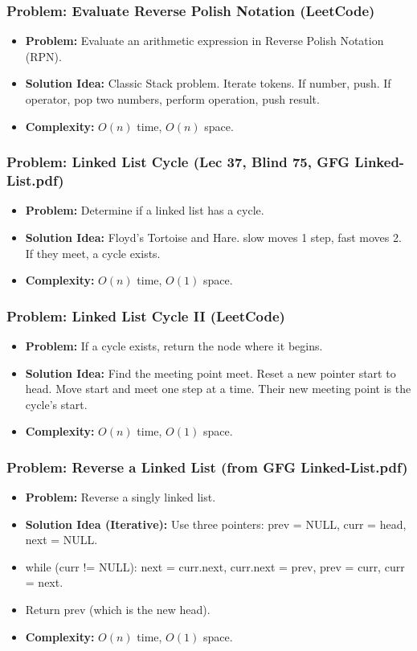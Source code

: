 \subsubsection{Problem: Evaluate Reverse Polish Notation (LeetCode)}
\begin{itemize}
\item \textbf{Problem:} Evaluate an arithmetic expression in Reverse Polish Notation (RPN).
\item \textbf{Solution Idea:} Classic Stack problem. Iterate tokens. If number, push. If operator, pop two numbers, perform operation, push result.
\item \textbf{Complexity:} $O(n)$ time, $O(n)$ space.
\end{itemize}

\subsubsection{Problem: Linked List Cycle (Lec 37, Blind 75, GFG Linked-List.pdf)}
\begin{itemize}
\item \textbf{Problem:} Determine if a linked list has a cycle.
\item \textbf{Solution Idea:} Floyd's Tortoise and Hare. slow moves 1 step, fast moves 2. If they meet, a cycle exists.
\item \textbf{Complexity:} $O(n)$ time, $O(1)$ space.
\end{itemize}

\subsubsection{Problem: Linked List Cycle II (LeetCode)}
\begin{itemize}
\item \textbf{Problem:} If a cycle exists, return the node where it begins.
\item \textbf{Solution Idea:} Find the meeting point meet. Reset a new pointer start to head. Move start and meet one step at a time. Their new meeting point is the cycle's start.
\item \textbf{Complexity:} $O(n)$ time, $O(1)$ space.
\end{itemize}

\subsubsection{Problem: Reverse a Linked List (from GFG Linked-List.pdf)}
\begin{itemize}
\item \textbf{Problem:} Reverse a singly linked list.
\item \textbf{Solution Idea (Iterative):} Use three pointers: prev = NULL, curr = head, next = NULL.
\item while (curr != NULL): next = curr.next, curr.next = prev, prev = curr, curr = next.
\item Return prev (which is the new head).
\item \textbf{Complexity:} $O(n)$ time, $O(1)$ space.
\end{itemize}

